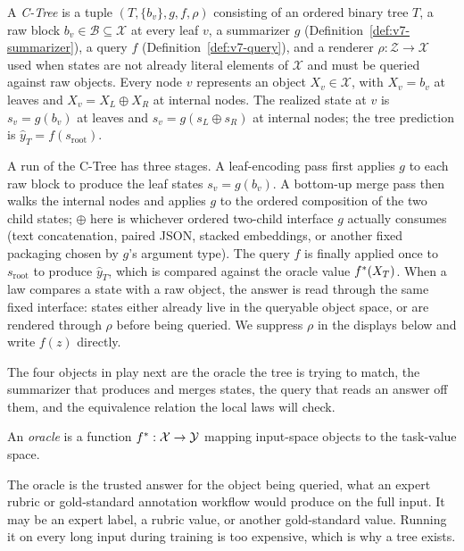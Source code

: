 \begin{definition}[C-Tree]
\label{def:v7-ctree}
A \emph{C-Tree} is a tuple \((T,\{b_v\},g,f,\rho)\) consisting of an
ordered binary tree \(T\), a raw block \(b_v\in\mathcal{B}\subseteq\mathcal{X}\) at every
leaf \(v\), a summarizer \(g\) (Definition~\ref{def:v7-summarizer}),
a query \(f\) (Definition~\ref{def:v7-query}), and a renderer
\(\rho:\mathcal{Z}\to\mathcal{X}\) used when states are not already
literal elements of \(\mathcal{X}\) and must be queried
against raw objects. Every node \(v\) represents an object
\(X_v\in\mathcal{X}\), with \(X_v=b_v\) at leaves and
\(X_v=X_L\oplus X_R\) at internal nodes. The realized state at \(v\)
is \(s_v=g(b_v)\) at leaves and \(s_v=g(s_L\oplus s_R)\) at internal
nodes; the tree prediction is
\(\widehat y_T = f(s_{\mathrm{root}})\).
\end{definition}

A run of the C-Tree has three stages. A leaf-encoding pass first
applies \(g\) to each raw block to produce the leaf states
\(s_v=g(b_v)\). A bottom-up merge pass then walks the internal nodes
and applies \(g\) to the ordered composition of the two child states;
\(\oplus\) here is whichever ordered two-child interface \(g\)
actually consumes (text concatenation, paired JSON, stacked
embeddings, or another fixed packaging chosen by \(g\)'s argument
type). The query \(f\) is finally applied once to
\(s_{\mathrm{root}}\) to produce \(\widehat y_T\), which is compared
against the oracle value \(f^\ast(X_T)\). When a law compares a state
with a raw object, the answer is read through the same fixed
interface: states either already live in the queryable object space,
or are rendered through \(\rho\) before being queried. We suppress
\(\rho\) in the displays below and write \(f(z)\) directly.

The four objects in play next are the oracle the tree is trying to
match, the summarizer that produces and merges states, the query that
reads an answer off them, and the equivalence relation the local laws
will check.

\begin{definition}[Oracle]
\label{def:v7-oracle}
An \emph{oracle} is a function \(f^\ast:\mathcal{X}\to\mathcal{Y}\) mapping
input-space objects to the task-value space.
\end{definition}

The oracle is the trusted answer for the object being queried, what an
expert rubric or gold-standard annotation workflow would produce on the
full input. It may be an expert label, a rubric value, or another
gold-standard value. Running it on every long input during training is
too expensive, which is why a tree exists.

